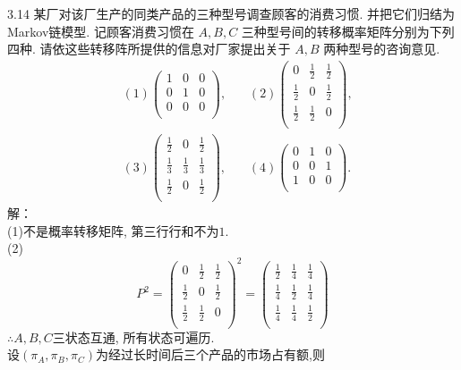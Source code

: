 3.14 某厂对该厂生产的同类产品的三种型号调查顾客的消费习惯. 并把它们归结为Markov链模型. 记顾客消费习惯在 $A, B, C $ 三种型号间的转移概率矩阵分别为下列四种. 请依这些转移阵所提供的信息对厂家提出关于 $A, B$ 两种型号的咨询意见.\\
\[
\begin{split}
&(1)\begin{pmatrix}
	1 & 0 & 0\\
	0 & 1 & 0\\
	0 & 0 & 0\\
	\end{pmatrix},~~~~~~~~
(2)\begin{pmatrix}
	0 & \frac{1}{2} & \frac{1}{2}\\
	\frac{1}{2} & 0 & \frac{1}{2}\\
	\frac{1}{2} & \frac{1}{2} & 0\\
	\end{pmatrix},\\
&(3)\begin{pmatrix}
	\frac{1}{2} & 0 & \frac{1}{2}\\
	\frac{1}{3} & \frac{1}{3} & \frac{1}{3}\\
	\frac{1}{2} & 0 & \frac{1}{2}\\
	\end{pmatrix},~~~~~~~~
(4)\begin{pmatrix}
	0 & 1 & 0\\
	0 & 0 & 1\\
	1 & 0 & 0\\
	\end{pmatrix}.
\end{split}
\]
解：\\
(1)不是概率转移矩阵, 第三行行和不为$1$.\\
(2)
\[
P^2 =
\begin{pmatrix}
0 & \frac{1}{2} & \frac{1}{2}\\
\frac{1}{2} & 0 & \frac{1}{2}\\
\frac{1}{2} & \frac{1}{2} & 0\\
\end{pmatrix}^2
=
\begin{pmatrix}
\frac{1}{2} & \frac{1}{4} & \frac{1}{4}\\
\frac{1}{4} & \frac{1}{2} & \frac{1}{4}\\
\frac{1}{4} & \frac{1}{4} & \frac{1}{2}\\
\end{pmatrix}
\]
$\therefore A,B,C$三状态互通, 所有状态可遍历.\\
设$(\pi_A,\pi_B,\pi_C)$为经过长时间后三个产品的市场占有额,则

